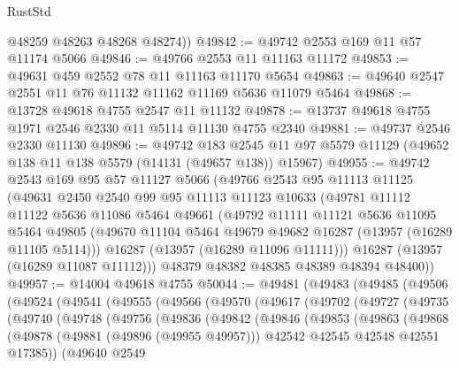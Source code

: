 \begin{lexlean}{RustStd}
\begin{coremodule}
        @48259
        @48263
        @48268
        @48274))
@49842 := @49742 @2553 @169 @11 @57 @11174 @5066
@49846 := @49766 @2553 @11 @11163 @11172
@49853 := @49631 @459 @2552 @78 @11 @11163 @11170 @5654
@49863 := @49640 @2547 @2551 @11 @76 @11132 @11162 @11169 @5636 @11079 @5464
@49868 := @13728 @49618 @4755 @2547 @11 @11132
@49878 := @13737 @49618 @4755 @1971 @2546 @2330 @11 @5114 @11130 @4755 @2340
@49881 := @49737 @2546 @2330 @11130
@49896 := @49742
    @183
    @2545
    @11
    @97
    @5579
    @11129
    (@49652 @138 @11 @138 @5579 (@14131 (@49657 @138)) @15967)
@49955 := @49742
    @2543
    @169
    @95
    @57
    @11127
    @5066
    (@49766
      @2543
      @95
      @11113
      @11125
      (@49631
        @2450
        @2540
        @99
        @95
        @11113
        @11123
        @10633
        (@49781
          @11112
          @11122
          @5636
          @11086
          @5464
          @49661
          (@49792
            @11111
            @11121
            @5636
            @11095
            @5464
            @49805
            (@49670 @11104 @5464 @49679 @49682 @16287 (@13957 (@16289 @11105 @5114)))
            @16287
            (@13957 (@16289 @11096 @11111)))
          @16287
          (@13957 (@16289 @11087 @11112)))
        @48379
        @48382
        @48385
        @48389
        @48394
        @48400))
@49957 := @14004 @49618 @4755
@50044 := @49481
    (@49483
      (@49485
        (@49506
          (@49524
            (@49541
              (@49555
                (@49566
                  (@49570
                    (@49617
                      (@49702
                        (@49727
                          (@49735
                            (@49740
                              (@49748
                                (@49756
                                  (@49836
                                    (@49842
                                      (@49846
                                        (@49853
                                          (@49863
                                            (@49868
                                              (@49878
                                                (@49881 (@49896 (@49955 @49957)))
                                                @42542
                                                @42545
                                                @42548
                                                @42551
                                                @17385))
                                            (@49640
                                              @2549

\end{coremodule}
\end{lexlean}

